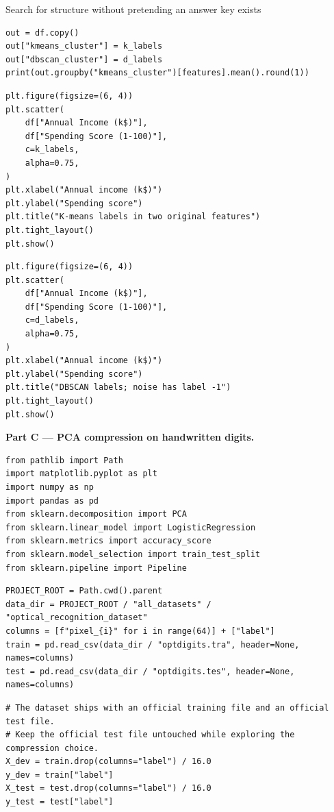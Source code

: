\begin{labproject}{Search for structure without pretending an answer key exists}
\begin{lstlisting}[style=mlpython]
out = df.copy()
out["kmeans_cluster"] = k_labels
out["dbscan_cluster"] = d_labels
print(out.groupby("kmeans_cluster")[features].mean().round(1))
\end{lstlisting}

\begin{lstlisting}[style=mlpython]
plt.figure(figsize=(6, 4))
plt.scatter(
    df["Annual Income (k$)"],
    df["Spending Score (1-100)"],
    c=k_labels,
    alpha=0.75,
)
plt.xlabel("Annual income (k$)")
plt.ylabel("Spending score")
plt.title("K-means labels in two original features")
plt.tight_layout()
plt.show()
\end{lstlisting}

\begin{lstlisting}[style=mlpython]
plt.figure(figsize=(6, 4))
plt.scatter(
    df["Annual Income (k$)"],
    df["Spending Score (1-100)"],
    c=d_labels,
    alpha=0.75,
)
plt.xlabel("Annual income (k$)")
plt.ylabel("Spending score")
plt.title("DBSCAN labels; noise has label -1")
plt.tight_layout()
plt.show()
\end{lstlisting}

\medskip\noindent\textbf{Part C --- PCA compression on handwritten digits.}\par
\begin{lstlisting}[style=mlpython]
from pathlib import Path
import matplotlib.pyplot as plt
import numpy as np
import pandas as pd
from sklearn.decomposition import PCA
from sklearn.linear_model import LogisticRegression
from sklearn.metrics import accuracy_score
from sklearn.model_selection import train_test_split
from sklearn.pipeline import Pipeline
\end{lstlisting}

\begin{lstlisting}[style=mlpython]
PROJECT_ROOT = Path.cwd().parent
data_dir = PROJECT_ROOT / "all_datasets" / "optical_recognition_dataset"
columns = [f"pixel_{i}" for i in range(64)] + ["label"]
train = pd.read_csv(data_dir / "optdigits.tra", header=None, names=columns)
test = pd.read_csv(data_dir / "optdigits.tes", header=None, names=columns)
\end{lstlisting}

\begin{lstlisting}[style=mlpython]
# The dataset ships with an official training file and an official test file.
# Keep the official test file untouched while exploring the compression choice.
X_dev = train.drop(columns="label") / 16.0
y_dev = train["label"]
X_test = test.drop(columns="label") / 16.0
y_test = test["label"]


\end{lstlisting}
\end{labproject}
